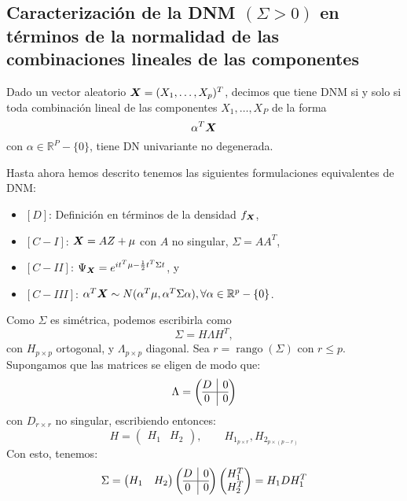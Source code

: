 \subsection{Caracterización de la DNM $(\Sigma > 0)$ en términos de la normalidad de las combinaciones lineales de las componentes}

Dado un vector aleatorio $\boldsymbol{X} = (X_1,\dots,X_p)^T$, decimos que tiene DNM si y solo si toda combinación lineal de las componentes $X_1,\dots,X_P$ de la forma
\[
\alpha^T \boldsymbol{X}
\]
con $\alpha\in \mathbb R^P -\{0\}$, tiene DN univariante no degenerada.

Hasta ahora hemos descrito tenemos las siguientes formulaciones equivalentes de DNM:
\begin{itemize}
\item $[D]$: Definición en términos de la densidad $f_{\boldsymbol{X}}$,
\item $[C-I]$: $\boldsymbol{X} = AZ + \mu$ con $A$ no singular, $\Sigma = AA^T$,
\item $[C-II]$: $\Psi_{\boldsymbol{X}} = e^{it^T\mu - \frac{1}{2}t^T \Sigma t}$, y
\item $[C-III]$: $\alpha^T \boldsymbol{X} \sim N(\alpha^T \mu, \alpha^T \Sigma \alpha), \forall \alpha \in \mathbb R^p - \{0\}$.
\end{itemize}


\begin{nota}
Como $\Sigma$ es simétrica, podemos escribirla como
\[
\Sigma = H \Lambda H^T,
\]
con $H_{p\times p}$ ortogonal, y $\Lambda_{p \times p}$ diagonal. Sea $r = \operatorname{rango}(\Sigma)$ con $r\leq p$.\\

Supongamos que las matrices se eligen de modo que:
\[
\Lambda = \left(\begin{array}{@{}c|c@{}}
  D & 0 \\\hline
  0 & 0
  \end{array}\right)
\]
con $D_{r\times r}$ no singular, escribiendo entonces:
\[
H = \begin{pmatrix} H_1 & H_2 \end{pmatrix}, \quad \quad H_{1_{p \times r}}, H_{2_{p\times (p-r)}}
\]
Con esto, tenemos:
\[
\Sigma = \begin{pmatrix} H_1 & H_2 \end{pmatrix}\left(\begin{array}{@{}c|c@{}}
  D & 0 \\\hline
  0 & 0
  \end{array}\right)\begin{pmatrix} H_1^T  \\ H_2^T \end{pmatrix} = H_1 D H_1^T
\]

\end{nota}

